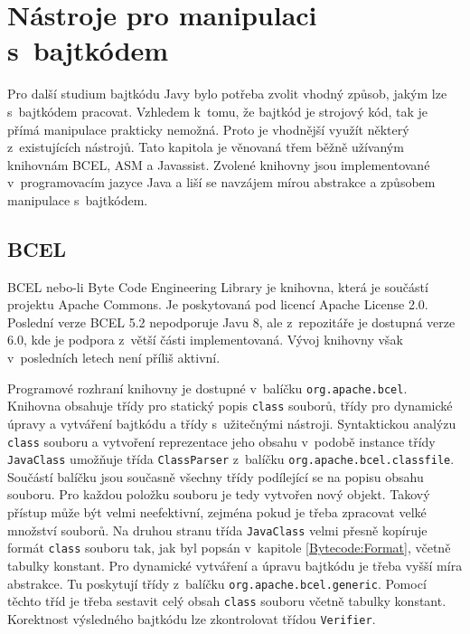 \chapter{Nástroje pro manipulaci s~bajtkódem}\label{Tools}

Pro další studium bajtkódu Javy bylo potřeba zvolit vhodný způsob, jakým lze s~bajtkódem pracovat.
Vzhledem k~tomu, že bajtkód je strojový kód, tak je přímá manipulace prakticky nemožná. Proto je vhodnější využít některý z~existujících nástrojů. Tato kapitola je věnovaná třem běžně užívaným knihovnám BCEL, ASM a Javassist. Zvolené knihovny jsou implementované v~programovacím jazyce Java a liší se navzájem mírou abstrakce a způsobem manipulace s~bajtkódem.


\section{BCEL}\label{Tools:BCEL}


BCEL \cite{BCEL} nebo-li Byte Code Engineering Library je knihovna, která je součástí projektu Apache Commons. Je poskytovaná pod licencí Apache License 2.0. Poslední verze BCEL 5.2 nepodporuje Javu 8, ale z~repozitáře je dostupná verze 6.0, kde je podpora z~větší části implementovaná. Vývoj knihovny však v~posledních letech není příliš aktivní. 

Programové rozhraní knihovny je dostupné v~balíčku \texttt{org.apache.bcel}. Knihovna obsahuje třídy pro statický popis \texttt{class} souborů, třídy pro dynamické úpravy a vytváření bajtkódu a třídy s~užitečnými nástroji. Syntaktickou analýzu \texttt{class} souboru a vytvoření reprezentace jeho obsahu v~podobě instance třídy \texttt{JavaClass} umožňuje třída \texttt{ClassParser} z~balíčku \texttt{org.apache.bcel.classfile}. Součástí balíčku jsou současně všechny třídy podílející se na popisu obsahu souboru. Pro každou položku souboru je tedy vytvořen nový objekt. Takový přístup může být velmi neefektivní, zejména pokud je třeba zpracovat velké množství souborů. Na druhou stranu třída \texttt{JavaClass} velmi přesně kopíruje formát \texttt{class} souboru tak, jak byl popsán v~kapitole \ref{Bytecode:Format}, včetně tabulky konstant.
Pro dynamické vytváření a úpravu bajtkódu je třeba vyšší míra abstrakce. Tu poskytují třídy z~balíčku \texttt{org.apache.bcel.generic}. Pomocí těchto tříd je třeba sestavit celý obsah \texttt{class} souboru včetně tabulky konstant. Korektnost výsledného bajtkódu lze zkontrolovat třídou \texttt{Verifier}.

